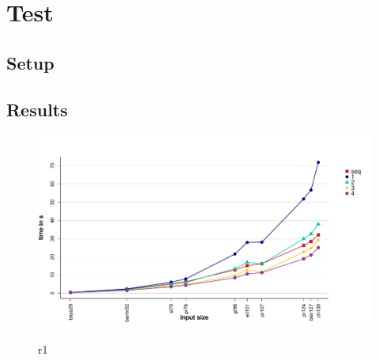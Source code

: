 \chapter{Test}

\section{Setup}

\section{Results}
\begin{figure}
  \centering
  \includegraphics[width=\textwidth]{img/test_local_1.pdf}
  \label{fig:test_local_1}
  \caption{r1}
\end{figure}